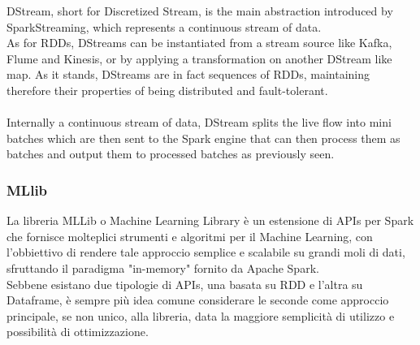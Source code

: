 DStream, short for Discretized Stream, is the main abstraction introduced by SparkStreaming, which represents a continuous stream of data. \\
As for RDDs, DStreams can be instantiated from a stream source like Kafka, Flume and Kinesis, or by applying a transformation on another DStream like map. As it stands, DStreams are in fact sequences of RDDs, maintaining therefore their properties of being distributed and fault-tolerant.
\\ \\
Internally a continuous stream of data, DStream splits the live flow into mini batches which are then sent to the Spark engine that can then process them as batches and output them to processed batches as previously seen.

\subsubsection{MLlib}
La libreria MLLib o Machine Learning Library è un estensione di APIs per Spark che fornisce molteplici strumenti e algoritmi per il Machine Learning, con l'obbiettivo di rendere tale approccio semplice e scalabile su grandi moli di dati, sfruttando il paradigma "in-memory" fornito da Apache Spark.\\
Sebbene esistano due tipologie di APIs, una basata su RDD e l'altra su Dataframe, è sempre più idea comune considerare le seconde come approccio principale, se non unico, alla libreria, data la maggiore semplicità di utilizzo e possibilità di ottimizzazione.
